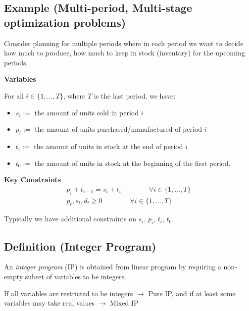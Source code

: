 \subsection{Example (Multi-period, Multi-stage optimization problems)}
Consider planning for multiple periods where in each period we
want to decide how much to produce, how much to keep in stock
(inventory) for the upcoming periods.

\textbf{Variables}

For all $ i\in \{1,\ldots,T\} $, where $ T $ is the last period, we have:
\begin{itemize}
    \item $ s_i:= $ the amount of units sold in period $ i $
    \item $ p_i:= $ the amount of units purchased/manufactured of period $ i $
    \item $ t_i:= $ the amount of units in stock at the end of period $ i $
    \item $ t_0:= $ the amount of units in stock at the beginning of the first period.
\end{itemize}
\textbf{Key Constraints}
\begin{align*}
    p_i+t_{i-1}=s_{i}+t_i \qquad\qquad \forall i\in \{1,\dots,T\}\\
    p_t,s_t,d_t\ge 0 \qquad\qquad \forall i\in \{1,\dots,T\}
\end{align*}
\begin{remark}
    Typically we have additional constraints on $s_i,\,p_i,\,t_i,\,t_0$.
\end{remark}

\begin{defbox}
    \subsection{Definition (Integer Program)}
    An \emph{integer program} (IP) is obtained from linear program 
    by requiring a non-empty subset of variables to be integers.
\end{defbox}

\begin{remark}
    If all variables are restricted to be integers $\rightarrow$ Pure IP,
    and if at least some variables may take real values $\rightarrow$ Mixed IP
\end{remark}
